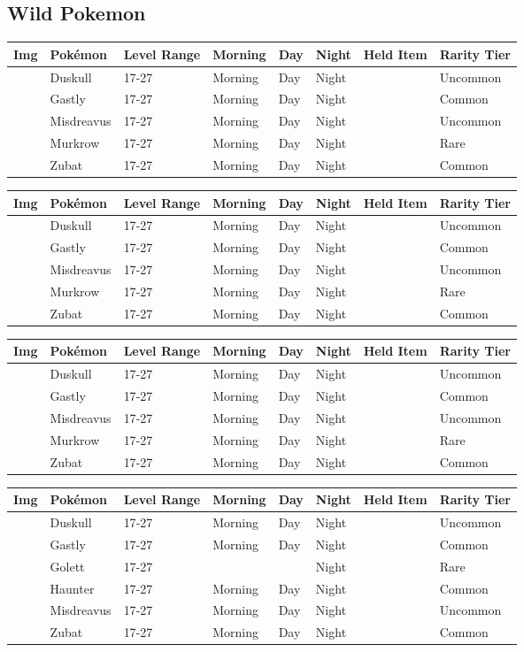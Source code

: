 \subsection{Wild Pokemon}%
\label{subsec:WildPokemon}%
\begin{longtable}{||l l l l l l l l||}%
\hline%
Img&Pokémon&Level Range&Morning&Day&Night&Held Item&Rarity Tier\\%
\hline%
\endhead%
\hline%
&Duskull&17{-}27&Morning&Day&Night&&Uncommon\\%
\hline%
&Gastly&17{-}27&Morning&Day&Night&&Common\\%
\hline%
&Misdreavus&17{-}27&Morning&Day&Night&&Uncommon\\%
\hline%
&Murkrow&17{-}27&Morning&Day&Night&&Rare\\%
\hline%
&Zubat&17{-}27&Morning&Day&Night&&Common\\%
\hline%
\end{longtable}%
\begin{longtable}{||l l l l l l l l||}%
\hline%
Img&Pokémon&Level Range&Morning&Day&Night&Held Item&Rarity Tier\\%
\hline%
\endhead%
\hline%
&Duskull&17{-}27&Morning&Day&Night&&Uncommon\\%
\hline%
&Gastly&17{-}27&Morning&Day&Night&&Common\\%
\hline%
&Misdreavus&17{-}27&Morning&Day&Night&&Uncommon\\%
\hline%
&Murkrow&17{-}27&Morning&Day&Night&&Rare\\%
\hline%
&Zubat&17{-}27&Morning&Day&Night&&Common\\%
\hline%
\end{longtable}%
\begin{longtable}{||l l l l l l l l||}%
\hline%
Img&Pokémon&Level Range&Morning&Day&Night&Held Item&Rarity Tier\\%
\hline%
\endhead%
\hline%
&Duskull&17{-}27&Morning&Day&Night&&Uncommon\\%
\hline%
&Gastly&17{-}27&Morning&Day&Night&&Common\\%
\hline%
&Misdreavus&17{-}27&Morning&Day&Night&&Uncommon\\%
\hline%
&Murkrow&17{-}27&Morning&Day&Night&&Rare\\%
\hline%
&Zubat&17{-}27&Morning&Day&Night&&Common\\%
\hline%
\end{longtable}%
\begin{longtable}{||l l l l l l l l||}%
\hline%
Img&Pokémon&Level Range&Morning&Day&Night&Held Item&Rarity Tier\\%
\hline%
\endhead%
\hline%
&Duskull&17{-}27&Morning&Day&Night&&Uncommon\\%
\hline%
&Gastly&17{-}27&Morning&Day&Night&&Common\\%
\hline%
&Golett&17{-}27&&&Night&&Rare\\%
\hline%
&Haunter&17{-}27&Morning&Day&Night&&Common\\%
\hline%
&Misdreavus&17{-}27&Morning&Day&Night&&Uncommon\\%
\hline%
&Zubat&17{-}27&Morning&Day&Night&&Common\\%
\hline%
\end{longtable}